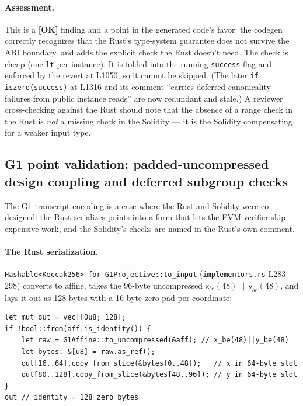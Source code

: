 \paragraph{Assessment.} This is a \textcolor{tracegreen}{\textbf{[OK]}}
finding and a point in the generated code's favor: the codegen
correctly recognizes that the Rust's type-system guarantee does not
survive the ABI boundary, and adds the explicit check the Rust
doesn't need. The check is cheap (one \texttt{lt} per instance). It
is folded into the running \texttt{success} flag and enforced by the
revert at L1050, so it cannot be skipped. (The later
\texttt{if iszero(success)} at L1316 and its comment ``carries
deferred canonicality failures from public instance reads'' are now
redundant and stale.) A reviewer cross-checking against the Rust should note that
the absence of a range check in the Rust is \emph{not} a missing
check in the Solidity --- it is the Solidity compensating for a
weaker input type.

\subsection{G1 point validation: padded-uncompressed design coupling and deferred subgroup checks}
\label{sec:pr-g1-validate}

The G1 transcript-encoding is a case where the Rust and Solidity
were co-designed: the Rust serializes points into a form that lets
the EVM verifier skip expensive work, and the Solidity's checks are
named in the Rust's own comment.

\paragraph{The Rust serialization.} \texttt{Hashable<Keccak256> for
G1Projective::to\_\allowbreak{}input} (\texttt{implementors.rs} L283--298)
converts to affine, takes the 96-byte uncompressed
$\mathsf{x}_{be}(48)\,\|\,\mathsf{y}_{be}(48)$, and lays it out as
128 bytes with a 16-byte zero pad per coordinate:
\begin{lstlisting}[style=rust]
let mut out = vec![0u8; 128];
if !bool::from(aff.is_identity()) {
    let raw = G1Affine::to_uncompressed(&aff); // x_be(48)||y_be(48)
    let bytes: &[u8] = raw.as_ref();
    out[16..64].copy_from_slice(&bytes[0..48]);   // x in 64-byte slot
    out[80..128].copy_from_slice(&bytes[48..96]); // y in 64-byte slot
}
out // identity = 128 zero bytes
\end{lstlisting}


